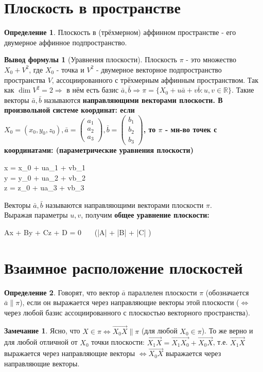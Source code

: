 \documentclass[a4paper, 12pt]{article}
\theoremstyle{definition}
\newtheorem*{definition}{Определение}
\newtheorem*{formula}{Вывод формулы}
\newtheorem*{remark}{Замечание}
\newenvironment{boxedalign*}
  {\begin{equation*}\begin{lrbox}{\boxedalignbox}$\begin{aligned}}
  {\end{aligned}$\end{lrbox}\fbox{\usebox{\boxedalignbox}}\end{equation*}}
\begin{document}
	\section{Плоскость в пространстве}
	\begin{definition}
		Плоскость в (трёхмерном) аффинном пространстве - его двумерное аффинное подпространство.
	\end{definition}
	\begin{formula}[Уравнения плоскости]
		Плоскость $\pi$ - это множество $X_0 + V^2$, где $X_0$ - точка и $V^2$ - двумерное векторное подпространство пространства $V$, ассоциированного с трёхмерным аффинным пространством.
		Так как $\dim V^2 = 2 \Rightarrow$ в нём есть базис $\bar{a}, \bar{b} \Rightarrow \pi = \{X_0 + u\bar{a} + v\bar{b}: u, v\in\mathbb{R}\}$. Такие векторы $\bar{a}, \bar{b}$ называются \bfseries направляющими векторами плоскости\mdseries.
		В произвольной системе координат: если $X_0 = (x_0, y_0, z_0), \bar{a} = \begin{pmatrix} a_1 \\ a_2 \\ a_3 \end{pmatrix}, \bar{b} = \begin{pmatrix}  b_1 \\ b_2 \\ b_3 \end{pmatrix}$, то $\pi$ - мн-во точек с координатами: (\bfseries параметрические уравнения плоскости\mdseries)
		\begin{boxedalign*}\begin{cases} x = x_0 + ua_1 + vb_1 \\ y = y_0 + ua_2 + vb_2 \\ z = z_0 + ua_3 + vb_3\end{cases}\end{boxedalign*}
		Векторы $\bar{a}, \bar{b}$ называются направляющими векторами плоскости $\pi$.\\
		Выражая параметры $u, v$, получим \bfseries общее уравнение плоскости\mdseries :
		\begin{boxedalign*}Ax + By + Cz + D = 0 \ \ \ (|A| + |B| + |C| )\end{boxedalign*}
	\end{formula}
	\section{Взаимное расположение плоскостей}
	\begin{definition}
		Говорят, что вектор $\bar{a}$ параллелен плоскости $\pi$ (обозначается $\bar{a} \parallel \pi$), если он выражается через направляющие векторы этой плоскости ($\Leftrightarrow$ через любой базис ассоциированного с плоскостью векторного пространства).
	\end{definition}
	\begin{remark}
		Ясно, что $X\in \pi \Leftrightarrow \overrightarrow{X_0X} \parallel \pi$ (для любой $X_0 \in \pi$). То же верно и для любой отличной от $X_0$ точки плоскости: $\overrightarrow{X_1X} = \overrightarrow{X_1X_0} + \overrightarrow{X_0X}$, т.е. $\overrightarrow{X_1X}$ выражается через направляющие векторы $\Leftrightarrow \overrightarrow{X_0X}$ выражается через направляющие векторы.
	\end{remark}
\end{document}
